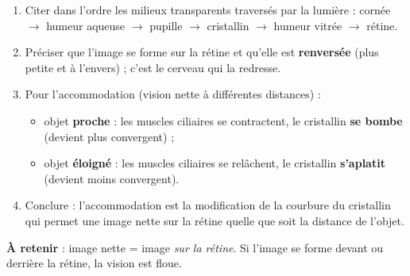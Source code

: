 \documentclass[11pt]{article}
\newcommand{\cle}[1]{{\popxbold\color{popdark}#1}}
\begin{document}
\begin{methode}
\begin{enumerate}
\item Citer dans l'ordre les \cle{milieux transparents} traversés par la lumière : cornée $\rightarrow$ humeur aqueuse $\rightarrow$ pupille $\rightarrow$ cristallin $\rightarrow$ humeur vitrée $\rightarrow$ rétine.
\item Préciser que l'image se forme sur la \cle{rétine} et qu'elle est \textbf{renversée} (plus petite et à l'envers) ; c'est le cerveau qui la redresse.
\item Pour l'\cle{accommodation} (vision nette à différentes distances) :
\begin{itemize}
\item objet \textbf{proche} : les muscles ciliaires se contractent, le cristallin \textbf{se bombe} (devient plus convergent) ;
\item objet \textbf{éloigné} : les muscles ciliaires se relâchent, le cristallin \textbf{s'aplatit} (devient moins convergent).
\end{itemize}
\item Conclure : l'accommodation est la modification de la courbure du cristallin qui permet une image nette sur la rétine quelle que soit la distance de l'objet.
\end{enumerate}
\textbf{À retenir} : image nette = image \emph{sur la rétine}. Si l'image se forme devant ou derrière la rétine, la vision est floue.
\end{methode}
\end{document}
